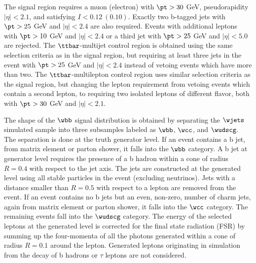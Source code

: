 
The signal region requires a muon (electron)
 with $\pt > 30$ GeV, pseudorapidity
 $|\eta| < 2.1$, and satisfying $I < 0.12~(0.10)$.
Exactly two b-tagged jets with
 $\pt > 25$ GeV and
 $|\eta| < 2.4$ are also required. %
Events with additional leptons with
 $\pt > 10$ GeV and $|\eta| < 2.4$ or
 a third jet with $\pt > 25$ GeV and $|\eta| < 5.0$
 are rejected.
The $\ttbar$-multijet control region is obtained
 using the same selection criteria as in the signal region,
 but requiring at least three jets in the event
 with $\pt>25$ GeV and $|\eta|<2.4$ instead of
 vetoing events which have more than two.
The $\ttbar$-multilepton control region uses
 similar selection criteria as the signal region,
 but changing the lepton requirement from vetoing
 events which contain a second lepton,
 to requiring two isolated leptons of different flavor,
 both with $\pt>30$ GeV and $|\eta|<2.1$.

The shape of the $\wbb$ signal distribution is obtained by separating
 the $\wjets$ simulated sample into three subsamples labeled as $\wbb$, $\wcc$, and $\wudscg$.
The separation is done at the truth generator level.
If an event contains a b jet, from matrix element or parton shower,
 it falls into the $\wbb$ category.
A b jet at generator level requires
 the presence of a b hadron within a cone of
 radius $R=0.4$ with respect to the jet axis.
The jets are constructed at the generated level using
 all stable particles in the event (excluding neutrinos).
Jets with a distance smaller than $R = 0.5$ with respect to a
 lepton are removed from the event.
If an event contains no b jets but
 an even, non-zero, number of charm jets,
 again from matrix element or
 parton shower, it falls into the $\wcc$ category.
The remaining events fall into the $\wudscg$ category.
The energy of the selected leptons at the generated level is corrected
 for the final state radiation (FSR) by summing up
 the four-momenta of
 all the photons generated within a cone of radius $R = 0.1$
 around the lepton.
Generated leptons originating in simulation from the decay of b hadrons or $\tau$ leptons
 are not considered.

